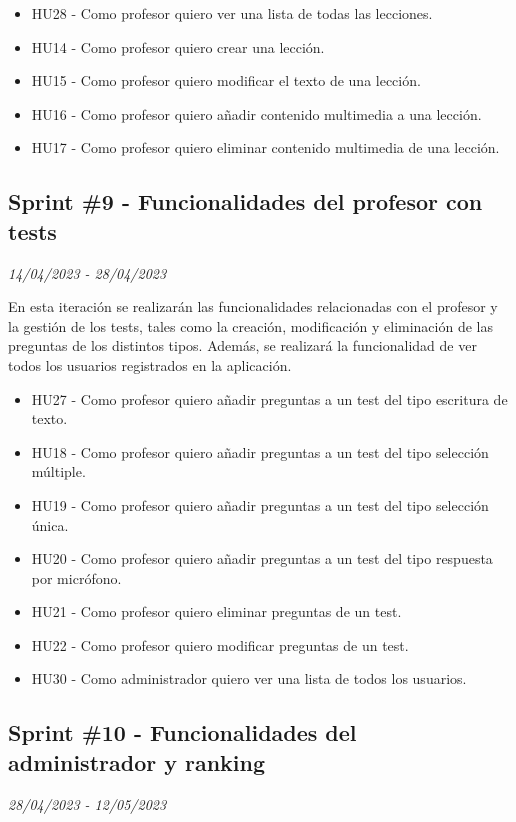 \begin{itemize}
    \item HU28 - Como profesor quiero ver una lista de todas las lecciones.
    \item HU14 - Como profesor quiero crear una lección.
    \item HU15 - Como profesor quiero modificar el texto de una lección.
    \item HU16 - Como profesor quiero añadir contenido multimedia a una lección.
    \item HU17 - Como profesor quiero eliminar contenido multimedia de una lección.
\end{itemize}

\subsection{Sprint \#9 - Funcionalidades del profesor con tests}
\textit{14/04/2023   -   28/04/2023}

En esta iteración se realizarán las funcionalidades relacionadas con el profesor y la gestión de los tests, tales como la creación, modificación y eliminación de las preguntas
de los distintos tipos. Además, se realizará la funcionalidad de ver todos los usuarios registrados en la aplicación.


\begin{itemize}
    \item HU27 - Como profesor quiero añadir preguntas a un test del tipo escritura de texto.
    \item HU18 - Como profesor quiero añadir preguntas a un test del tipo selección múltiple.
    \item HU19 - Como profesor quiero añadir preguntas a un test del tipo selección única.
    \item HU20 - Como profesor quiero añadir preguntas a un test del tipo respuesta por micrófono.
    \item HU21 - Como profesor quiero eliminar preguntas de un test.
    \item HU22 - Como profesor quiero modificar preguntas de un test.
    \item HU30 - Como administrador quiero ver una lista de todos los usuarios.
\end{itemize}

\newpage

\subsection{Sprint \#10 - Funcionalidades del administrador y ranking}
\textit{28/04/2023   -   12/05/2023}

